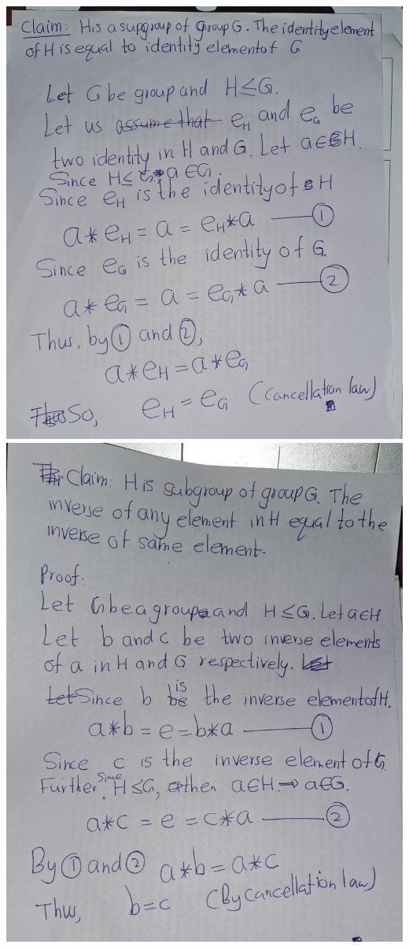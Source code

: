 \documentclass[
]{book}
\begin{document}
\includegraphics{figures/ch_2/fig49.jpg}
\includegraphics{figures/ch_2/fig50.jpg}
\end{document}
